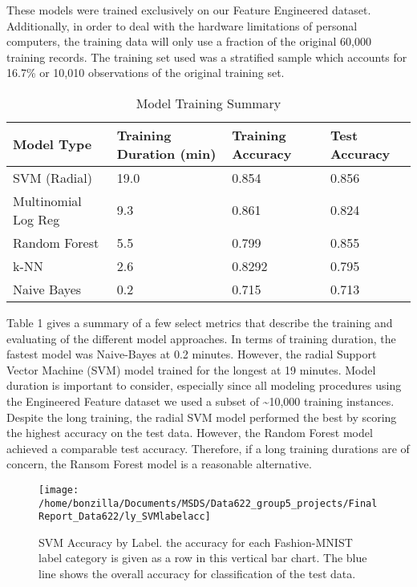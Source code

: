 \documentclass{article}
\begin{document}
These models were trained exclusively on our Feature Engineered dataset.
Additionally, in order to deal with the hardware limitations of personal
computers, the training data will only use a fraction of the original
60,000 training records. The training set used was a stratified sample
which accounts for 16.7\% or 10,010 observations of the original
training set.

\begin{table}
 \caption{Model Training Summary}
  \centering
  \begin{tabular}{llll}
    \toprule
    Model Type     & Training Duration (min)  & Training Accuracy & Test Accuracy \\
    \midrule
    SVM (Radial) & 19.0  & 0.854 & 0.856 \\
    Multinomial Log Reg     & 9.3  &  0.861 & 0.824 \\
    Random Forest     & 5.5  &  0.799 & 0.855 \\
    k-NN     & 2.6  &  0.8292 & 0.795 \\    
    Naive Bayes     & 0.2  & 0.715 & 0.713 \\    
    \bottomrule
  \end{tabular}
  \label{tab:table}
\end{table}

Table 1 gives a summary of a few select metrics that describe the
training and evaluating of the different model approaches. In terms of
training duration, the fastest model was Naive-Bayes at 0.2 minutes.
However, the radial Support Vector Machine (SVM) model trained for the
longest at 19 minutes. Model duration is important to consider,
especially since all modeling procedures using the Engineered Feature
dataset we used a subset of \textasciitilde10,000 training instances.
Despite the long training, the radial SVM model performed the best by
scoring the highest accuracy on the test data. However, the Random
Forest model achieved a comparable test accuracy. Therefore, if a long
training durations are of concern, the Ransom Forest model is a
reasonable alternative.

\begin{figure}

{\centering \texttt{[image: /home/bonzilla/Documents/MSDS/Data622\_group5\_projects/FinalReport\_Data622/ly\_SVMlabelacc]} 

}

\caption{SVM Accuracy by Label. the accuracy for each Fashion-MNIST label category is given as a row in this vertical bar chart. The blue line shows the overall accuracy for classification of the test data.}\label{fig:unnamed-chunk-4}
\end{figure}
\end{document}
